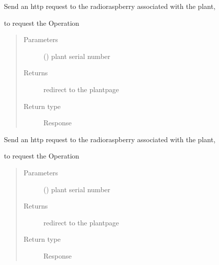 \documentclass[letterpaper,10pt,english]{sphinxmanual}
\begin{document}
\begin{fulllineitems}
\label{\detokenize{index:view.plant.humidity}}
Send an http request to the radio\sphinxhyphen{}raspberry associated with the plant,

to request the  Operation
\begin{quote}\begin{description}
\item[{Parameters}] \leavevmode
{} () \textendash{} plant serial number

\item[{Returns}] \leavevmode
redirect to the plantpage

\item[{Return type}] \leavevmode
Response

\end{description}\end{quote}

\end{fulllineitems}


\begin{fulllineitems}
\label{\detokenize{index:view.plant.light}}
Send an http request to the radio\sphinxhyphen{}raspberry associated with the plant,

to request the  Operation
\begin{quote}\begin{description}
\item[{Parameters}] \leavevmode
{} () \textendash{} plant serial number

\item[{Returns}] \leavevmode
redirect to the plantpage

\item[{Return type}] \leavevmode
Response

\end{description}\end{quote}

\end{fulllineitems}
\end{document}
